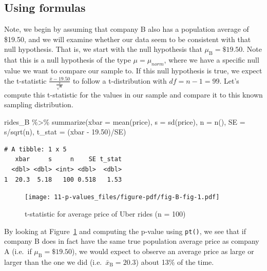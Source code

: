 \documentclass[
  letterpaper,
  DIV=11,
  numbers=noendperiod]{scrreprt}
\newenvironment{Shaded}{\begin{snugshade}}{\end{snugshade}}
\newcommand{\AttributeTok}[1]{\textcolor[rgb]{0.40,0.45,0.13}{#1}}
\newcommand{\FloatTok}[1]{\textcolor[rgb]{0.68,0.00,0.00}{#1}}
\newcommand{\FunctionTok}[1]{\textcolor[rgb]{0.28,0.35,0.67}{#1}}
\newcommand{\NormalTok}[1]{\textcolor[rgb]{0.00,0.23,0.31}{#1}}
\newcommand{\SpecialCharTok}[1]{\textcolor[rgb]{0.37,0.37,0.37}{#1}}
\theoremstyle{definition}
\theoremstyle{remark}
\begin{document}
\hypertarget{using-formulas}{%
\subsection{Using formulas}\label{using-formulas}}

Note, we begin by assuming that company B also has a population average
of \$19.50, and we will examine whether our data seem to be consistent
with that null hypothesis. That is, we start with the null hypothesis
that \(\mu_{\text{B}} = \$19.50\). Note that this is a null hypothesis
of the type \(\mu = \mu_{norm}\), where we have a specific null value we
want to compare our sample to. If this null hypothesis is true, we
expect the t-statistic \(\frac{\bar{x} - 19.50}{\frac{s}{\sqrt{n}}}\) to
follow a t-distribution with \(df = n - 1 = 99\). Let's compute this
t-statistic for the values in our sample and compare it to this known
sampling distribution.

\begin{Shaded}
\begin{Highlighting}[]
\NormalTok{rides\_B }\SpecialCharTok{\%\textgreater{}\%} 
  \FunctionTok{summarize}\NormalTok{(}\AttributeTok{xbar =} \FunctionTok{mean}\NormalTok{(price),}
            \AttributeTok{s =} \FunctionTok{sd}\NormalTok{(price),}
            \AttributeTok{n =} \FunctionTok{n}\NormalTok{(),}
            \AttributeTok{SE =}\NormalTok{ s}\SpecialCharTok{/}\FunctionTok{sqrt}\NormalTok{(n),}
            \AttributeTok{t\_stat =}\NormalTok{ (xbar }\SpecialCharTok{{-}} \FloatTok{19.50}\NormalTok{)}\SpecialCharTok{/}\NormalTok{SE)}
\end{Highlighting}
\end{Shaded}

\begin{verbatim}
# A tibble: 1 x 5
   xbar     s     n    SE t_stat
  <dbl> <dbl> <int> <dbl>  <dbl>
1  20.3  5.18   100 0.518   1.53
\end{verbatim}

\begin{figure}

{\centering \texttt{[image: 11-p-values\_files/figure-pdf/fig-B-fig-1.pdf]}

}

\caption{\label{fig-B-fig}t-statistic for average price of Uber rides (n
= 100)}

\end{figure}

By looking at Figure~\ref{fig-B-fig} and computing the p-value using
\texttt{pt()}, we see that if company B does in fact have the same true
population average price as company A (i.e.~if
\(\mu_{\text{B}} = \$19.50\)), we would expect to observe an average
price as large or larger than the one we did
(i.e.~\(\bar{x}_{\text{B}} = 20.3\)) about 13\% of the time.
\end{document}

